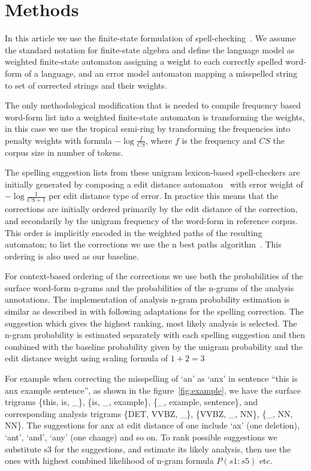 \documentclass[11pt,a4paper]{article}
\begin{document}
\section{Methods}
\label{sec:methods}

In this article we use the finite-state formulation of
spell-checking~\cite{pirinen/2010/cla}. We assume the standard notation for
finite-state algebra and define the language model as weighted finite-state
automaton assigning a weight to each correctly spelled word-form of a language,
and an error model automaton mapping a misspelled string to set of corrected
strings and their weights.

The only methodological modification that is needed to compile frequency based
word-form list into a weighted finite-state automaton is transforming the
weights, in this case we use the tropical semi-ring by transforming the
frequencies into penalty weights with formula $-\log\frac{f}{CS}$, where $f$ is
the frequency and $CS$ the corpus size in number of tokens.

The spelling suggestion lists from these unigram lexicon-based spell-checkers
are initially generated by composing a edit distance
automaton~\cite{agata/2002} with error weight of $-\log\frac{1}{CS+1}$ per edit
distance type of error. In practice this means that the corrections are
initially ordered primarily by the edit distance of the correction, and
secondarily by the unigram frequency of the word-form in reference corpus.
This order is implicitly encoded in the weighted paths of the resulting
automaton; to list the corrections we use the n best paths
algorithm~\cite{mohri/2002}. This ordering is also used as our baseline.

For context-based ordering of the corrections we use both the probabilities of
the surface word-form n-grams and the probabilities of the n-grams of the
analysis annotations. The implementation of analysis n-gram probability
estimation is similar as described in \cite{silfverberg/2010} with following
adaptations for the spelling correction. The suggestion which gives the highest
ranking, most likely analysis is selected.  The n-gram probability is estimated
separately with each spelling suggestion and then combined with the baseline
probability given by the unigram probability and the edit distance weight using
scaling formula of $1+2=3$

For example when correcting the misspelling of `an' as `anx' in sentence ``this
is anx example sentence'', as shown in the figure~\ref{fig:example}, we have
the surface trigrams \{this, is, \_\}, \{is, \_, example\}, \{\_, example,
sentence\}, and corresponding analysis trigrams \{DET, VVBZ, \_\}, \{VVBZ, \_,
NN\}, \{\_, NN, NN\}. The suggestions for anx at edit distance of one include
`ax' (one deletion), `ant', `and', `any' (one change) and so on. To rank
possible suggestions we substitute s3 for the suggestions, and estimate its
likely analysis, then use the ones with highest combined likelihood of n-gram
formula $P(s1:s5)$ etc.
\end{document}
